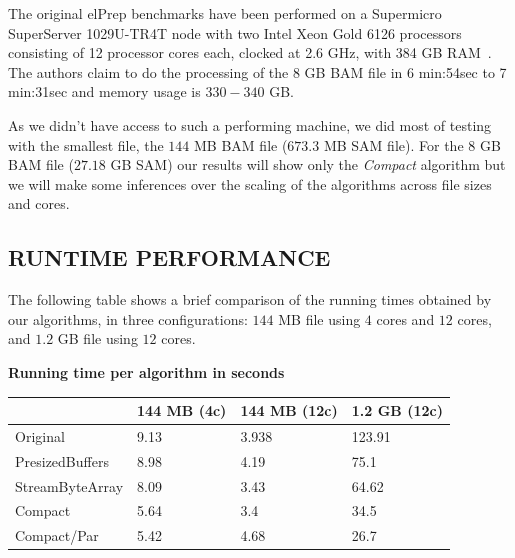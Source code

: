 \documentclass[a4paper,twoside]{article}
\begin{document}

The original elPrep benchmarks have been performed on a Supermicro SuperServer 1029U-TR4T node with two
Intel Xeon Gold 6126 processors consisting of 12 processor cores each, clocked at 2.6 GHz, with 384 GB RAM~\cite{costanza:2019}.
The authors claim to do the processing of the 8 GB BAM file in 6 min:54sec to 7 min:31sec and memory usage is $330-340$ GB\@.

As we didn't have access to such a performing machine, we did most of testing with the smallest file, the $144$ MB BAM file ($673.3$ MB SAM file). For the $8$ GB BAM file ($27.18$ GB SAM) our results will show only the {\textit{Compact} } algorithm but we will make some inferences over the scaling of the algorithms across file sizes and cores.





\subsection{\uppercase{Runtime performance}}
\label{subsec:runtimeperf}

The following table shows a brief comparison of the running times obtained by our algorithms, in three configurations: $144$ MB file using $4$ cores and $12$ cores, and $1.2$ GB file using $12$ cores. 

\begin{small}
\begin{center}
\textbf{Running time per algorithm in seconds} \\
\begin{tabular}{|C{2cm}|C{1.2cm}|C{1.2cm}|C{1.2cm}|}
\hline
						& 144 MB (4c)	& 144 MB (12c)		& 1.2 GB (12c)	\\ \hline
Original				& 9.13 			& 3.938 			& 123.91 		\\ \hline
PresizedBuffers			& 8.98 			& 4.19 				& 75.1 			\\ \hline
StreamByteArray			& 8.09 			& 3.43 				& 64.62 		\\ \hline
Compact 				& 5.64 			& 3.4 	 			& 34.5			\\ \hline
Compact/Par 			& 5.42		    & 4.68				& 26.7 			\\ \hline
\end{tabular}
\end{center}
\end{small}
\end{document}
